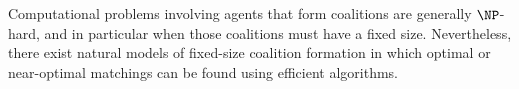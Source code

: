 
Computational problems involving agents that form coalitions are generally $\NP$-hard, and in particular when those coalitions must have a fixed size. Nevertheless, there exist natural models of fixed-size coalition formation in which optimal or near-optimal matchings can be found using efficient algorithms.